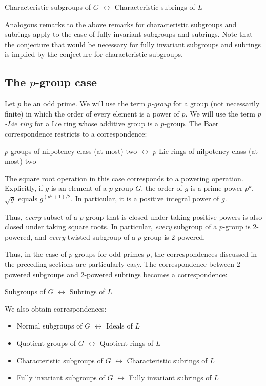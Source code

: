 \begin{center}
  Characteristic subgroups of $G$ $\leftrightarrow$ Characteristic
  subrings of $L$
\end{center}

Analogous remarks to the above remarks for characteristic subgroups
and subrings apply to the case of fully invariant subgroups and
subrings. Note that the conjecture that would be necessary for fully
invariant subgroups and subrings is implied by the conjecture for
characteristic subgroups.


\subsection{The $p$-group case}\label{sec:baer-p-group-case}

Let $p$ be an odd prime. We will use the term {\em $p$-group} for a
group (not necessarily finite) in which the order of every element is
a power of $p$. We will use the term {\em $p$-Lie ring} for a Lie ring
whose additive group is a $p$-group. The Baer correspondence restricts
to a correspondence:

\begin{center}
  $p$-groups of nilpotency class (at most) two $\leftrightarrow$ $p$-Lie rings of nilpotency class (at most) two
\end{center}

The square root operation in this case corresponds to a powering
operation. Explicitly, if $g$ is an element of a $p$-group $G$, the
order of $g$ is a prime power $p^k$. $\sqrt{g}$ equals $g^{(p^k +
  1)/2}$. In particular, it is a positive integral power of $g$.

Thus, {\em every} subset of a $p$-group that is closed under taking
positive powers is also closed under taking square roots. In
particular, {\em every} subgroup of a $p$-group is $2$-powered, and
{\em every} twisted subgroup of a $p$-group is $2$-powered.

Thus, in the case of $p$-groups for odd primes $p$, the
correspondences discussed in the preceding sections are particularly
easy. The correspondence between $2$-powered subgroups and $2$-powered
subrings becomes a correspondence:

\begin{center}
  Subgroups of $G$ $\leftrightarrow$ Subrings of $L$
\end{center}

We also obtain correspondences:

\begin{itemize}
\item Normal subgroups of $G$ $\leftrightarrow$ Ideals of $L$
\item Quotient groups of $G$ $\leftrightarrow$ Quotient rings of $L$
\item Characteristic subgroups of $G$ $\leftrightarrow$ Characteristic
  subrings of $L$
\item Fully invariant subgroups of $G$ $\leftrightarrow$ Fully
  invariant subrings of $L$
\end{itemize}



